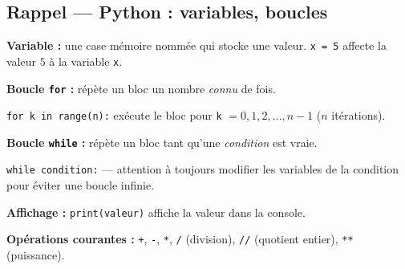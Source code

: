 

\subsection*{Rappel — Python : variables, boucles}

\textbf{Variable :} une case mémoire nommée qui stocke une valeur.
\verb|x = 5| affecte la valeur $5$ à la variable \verb|x|.

\textbf{Boucle \texttt{for} :} répète un bloc un nombre \emph{connu} de fois.

\verb|for k in range(n):| exécute le bloc pour \verb|k| $= 0, 1, 2, \ldots, n-1$ ($n$ itérations).

\textbf{Boucle \texttt{while} :} répète un bloc tant qu'une \emph{condition} est vraie.

\verb|while condition:| — attention à toujours modifier les variables de la condition pour éviter une boucle infinie.

\textbf{Affichage :} \verb|print(valeur)| affiche la valeur dans la console.

\textbf{Opérations courantes :} \verb|+|, \verb|-|, \verb|*|, \verb|/| (division), \verb|//| (quotient entier), \verb|**| (puissance).



